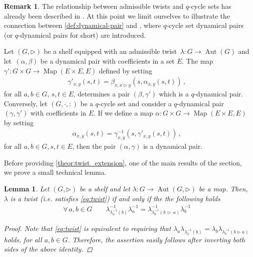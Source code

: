 \documentclass[preprint,1p]{elsarticle}
\numberwithin{equation}{section}
\newtheorem{lemma}[theor]{Lemma}
\theoremstyle{definition}               %
\newtheorem{rem}[theor]{Remark}
\newcommand{\tr}{\triangleright}
\DeclareMathOperator{\Aut}{Aut}
\DeclareMathOperator{\Map}{Map}
\begin{document}
\begin{rem}
    The relationship between admissible twists and $q$-cycle sets has already been described in \cite[Remark 2.19]{DoRySte24}.
    At this point we limit ourselves to illustrate the connection between \cref{def:dynamical-pair} and \cite[Definition 2]{CasCatSte22}, where $q$-cycle set dynamical pairs (or $q$-dynamical pairs for short) are introduced.
    
    Let $(G,\tr)$ be a shelf equipped with an admissible twist~$\lambda:G \to \Aut(G)$ and let~$(\alpha,\beta)$ be a dynamical pair with coefficients in a set $E$.
    The map ${\gamma':G \times G \to \Map(E \times E,E)}$ defined by setting
    \begin{align}\label{skew-cycle to q-cycle}
        \gamma'_{x,y}(s,t) = \beta_{x,x \tr y}(s, \alpha_{x,y}(s,t)) \,,
    \end{align}
    for all $a,b \in G$, $s,t \in E$, determines a pair $(\beta,\gamma')$ which is a $q$-dynamical pair.
    Conversely, let $(G,\cdot,:)$ be a $q$-cycle set and consider a $q$-dynamical pair $(\gamma,\gamma')$ with coefficients in $E$.
    If we define a map $\alpha: G \times G \to \Map(E \times E,E)$ by setting
    \begin{align}\label{q-cycle to skew-cycle}
        {\alpha_{x,y}(s,t) = \gamma_{x,y}^{-1}\left(s,\gamma'_{x,y}(s,t)\right)} \,,
    \end{align}
    for all $a,b \in G, s,t \in E$, then the pair $(\alpha,\gamma)$ is a dynamical pair.
\end{rem}

\medskip

Before providing \cref{theor:twist_extension}, one of the main results of the section, we prove a small technical lemma.

\begin{lemma}\label{lemma:YB1_shelf}
    Let $(G,\tr)$ be a shelf and let $\lambda:G \to \Aut(G,\tr)$ be a map.
    Then, $\lambda$ is a twist (i.e. satisfies \eqref{eq:twist}) if and only if the the following holds
    \begin{align}\label{eq:equi_first}
        \forall\, a,b \in G \qquad
        \lambda^{-1}_{\lambda^{-1}_a\left(b\right)}\lambda^{-1}_a
        = 
        \lambda^{-1}_{\lambda^{-1}_b\left(b\,\tr\, a\right)}
        \lambda^{-1}_b
    \end{align}
    \begin{proof}
        Note that \eqref{eq:twist} is equivalent to requiring that $\lambda_a\lambda_{\lambda^{-1}_a(b)} = \lambda_b\lambda_{\lambda^{-1}_b(b \tr a)}$ holds, for all $a,b \in G$.
        Therefore, the assertion easily follows after inverting both sides of the above identity.
    \end{proof}
\end{lemma}
\end{document}
